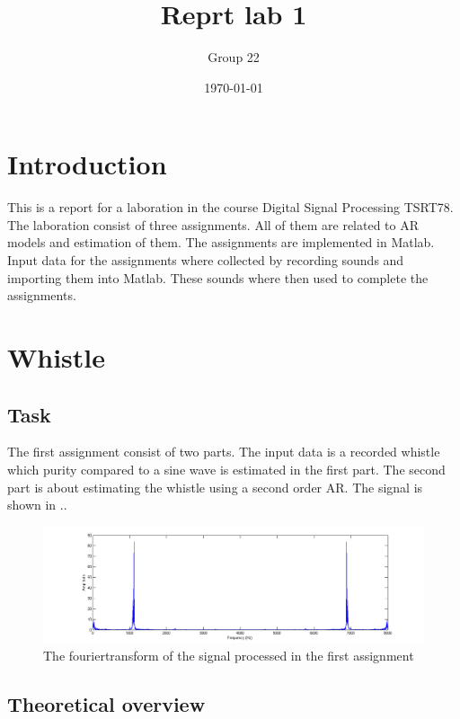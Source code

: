 \documentclass[12pt]{article}
\title{Reprt lab 1}
\author{Group 22}
\date{\today}
\begin{document}
%

\pagebreak

\maketitle

\pagebreak

\tableofcontents

\pagebreak

\section{Introduction}
This is a report for a laboration in the course Digital Signal Processing TSRT78.
The laboration consist of three assignments.
All of them are related to AR models and estimation of them.
The assignments are implemented in Matlab.
Input data for the assignments where collected by recording sounds and importing them into Matlab.
These sounds where then used to complete the assignments.

\section{Whistle}
\subsection{Task}
The first assignment consist of two parts. The input data is a recorded whistle which purity compared to a sine wave is estimated in the first part. The second part is about estimating the whistle using a second order AR. The signal is shown in .. %

\begin{figure}[H]
\centering
\includegraphics[width=14cm]{Fouriertranswhis.png}
\caption{The fouriertransform of the signal processed in the first assignment}
\end{figure}

\subsection{Theoretical overview}
\end{document}

